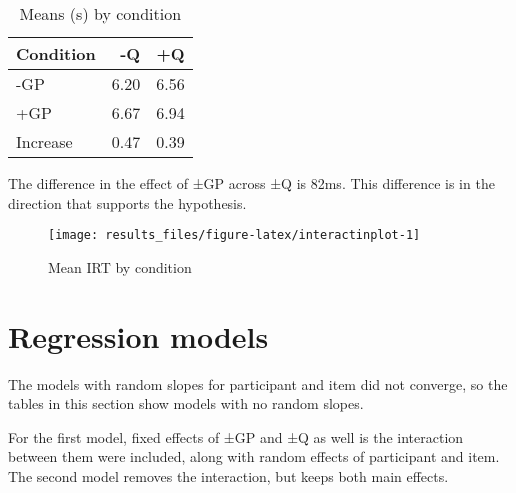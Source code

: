 \documentclass[]{tufte-handout}
\begin{document}
\begin{table}[t]

\caption{\label{tab:mns}Means (s) by condition}
\centering
\begin{tabular}{lrr}
\toprule
Condition & -Q & +Q\\
\midrule
-GP & 6.20 & 6.56\\
+GP & 6.67 & 6.94\\
Increase & 0.47 & 0.39\\
\bottomrule
\end{tabular}
\end{table}

The difference in the effect of ±GP across ±Q is 82ms. This difference
is in the direction that supports the hypothesis.

\begin{figure}
\texttt{[image: results\_files/figure-latex/interactinplot-1]} \caption[Mean IRT by condition]{Mean IRT by condition}\label{fig:interactinplot}
\end{figure}

\section{Regression models}\label{regression-models}

The models with random slopes for participant and item did not converge,
so the tables in this section show models with no random slopes.

For the first model, fixed effects of ±GP and ±Q as well is the
interaction between them were included, along with random effects of
participant and item. The second model removes the interaction, but
keeps both main effects.
\end{document}
